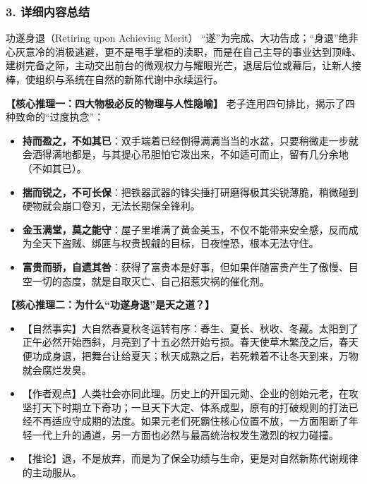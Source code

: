 \subsubsection{3. 详细内容总结}

\begin{ConceptBox}{功遂身退（Retiring upon Achieving Merit）}
“遂”为完成、大功告成；“身退”绝非心灰意冷的消极逃避，更不是甩手掌柜的渎职，而是在自己主导的事业达到顶峰、建树完备之际，主动交出前台的微观权力与耀眼光芒，退居后位或幕后，让新人接棒，使组织与系统在自然的新陈代谢中永续运行。
\end{ConceptBox}

\noindent\textbf{【核心推理一：四大物极必反的物理与人性隐喻】}
老子连用四句排比，揭示了四种致命的“过度执念”：
\begin{itemize}
    \item \textbf{持而盈之，不如其已}：双手端着已经倒得满满当当的水盆，只要稍微走一步就会洒得满地都是，与其提心吊胆怕它泼出来，不如适可而止，留有几分余地（不如其已）。
    \item \textbf{揣而锐之，不可长保}：把铁器武器的锋尖捶打研磨得极其尖锐薄脆，稍微碰到硬物就会崩口卷刃，无法长期保全锋利。
    \item \textbf{金玉满堂，莫之能守}：屋子里堆满了黄金美玉，不仅不能带来安全感，反而成为全天下盗贼、绑匪与权贵觊觎的目标，日夜惶恐，根本无法守住。
    \item \textbf{富贵而骄，自遗其咎}：获得了富贵本是好事，但如果伴随富贵产生了傲慢、目空一切的态度，就是自取灭亡、自己招惹灾祸的催化剂。
\end{itemize}

\noindent\textbf{【核心推理二：为什么“功遂身退”是天之道？】}
\begin{itemize}
    \item 【自然事实】大自然春夏秋冬运转有序：春生、夏长、秋收、冬藏。太阳到了正午必然开始西斜，月亮到了十五必然开始亏损。春天使草木繁茂之后，春天便功成身退，把舞台让给夏天；秋天成熟之后，若死赖着不让冬天到来，万物就会腐烂发臭。
    \item 【作者观点】人类社会亦同此理。历史上的开国元勋、企业的创始元老，在攻坚打天下时期立下奇功；一旦天下大定、体系成型，原有的打破规则的打法已经不再适应守成期的法度。如果元老们死霸住核心位置不放，一方面阻断了年轻一代上升的通道，另一方面也必然与最高统治权发生激烈的权力碰撞。
    \item 【推论】退，不是放弃，而是为了保全功绩与生命，更是对自然新陈代谢规律的主动服从。
\end{itemize}

